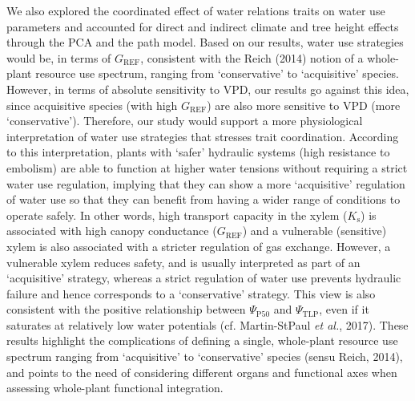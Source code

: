 \documentclass[11pt,twoside]{reedthesis}
\begin{document}
We also explored the coordinated effect of water relations traits on
water use parameters and accounted for direct and indirect climate and
tree height effects through the PCA and the path model. Based on our
results, water use strategies would be, in terms of \(G_{\text{REF}}\),
consistent with the Reich (2014) notion of a whole-plant resource use
spectrum, ranging from `conservative' to `acquisitive' species. However,
in terms of absolute sensitivity to VPD, our results go against this
idea, since acquisitive species (with high \(G_{\text{REF}}\)) are also
more sensitive to VPD (more `conservative'). Therefore, our study would
support a more physiological interpretation of water use strategies that
stresses trait coordination. According to this interpretation, plants
with `safer' hydraulic systems (high resistance to embolism) are able to
function at higher water tensions without requiring a strict water use
regulation, implying that they can show a more `acquisitive' regulation
of water use so that they can benefit from having a wider range of
conditions to operate safely. In other words, high transport capacity in
the xylem (\(K_\text{s}\)) is associated with high canopy conductance
(\(G_{\text{REF}}\)) and a vulnerable (sensitive) xylem is also
associated with a stricter regulation of gas exchange. However, a
vulnerable xylem reduces safety, and is usually interpreted as part of
an `acquisitive' strategy, whereas a strict regulation of water use
prevents hydraulic failure and hence corresponds to a `conservative'
strategy. This view is also consistent with the positive relationship
between \(\Psi_{\text{P50}}\) and \(\Psi_{\text{TLP}}\), even if it
saturates at relatively low water potentials (cf. Martin-StPaul \emph{et
al.}, 2017). These results highlight the complications of defining a
single, whole-plant resource use spectrum ranging from `acquisitive' to
`conservative' species (sensu Reich, 2014), and points to the need of
considering different organs and functional axes when assessing
whole-plant functional integration.\par
\end{document}
